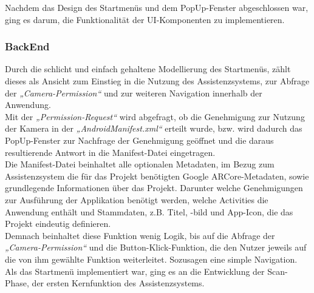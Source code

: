 Nachdem das Design des Startmenüs und dem PopUp-Fenster abgeschlossen war, ging es darum, die Funktionalität der UI-Komponenten zu implementieren. 
\subsubsection{BackEnd}
Durch die schlicht und einfach gehaltene Modellierung des Startmenüs, zählt dieses als Ansicht zum Einstieg in die Nutzung des Assistenzsystems, zur Abfrage der 
\textit{„Camera-Permission“} und zur weiteren Navigation innerhalb der Anwendung.
\\ 
Mit der \textit{„Permission-Request“} wird abgefragt, ob die Genehmigung zur Nutzung der Kamera in der \textit{„AndroidManifest.xml“} erteilt wurde, bzw. wird dadurch 
das PopUp-Fenster zur Nachfrage der Genehmigung geöffnet und die daraus resultierende Antwort in die Manifest-Datei eingetragen. 
\\ 
\linebreak
Die Manifest-Datei beinhaltet alle optionalen Metadaten, im Bezug zum Assistenzsystem die für das Projekt benötigten Google ARCore-Metadaten, sowie grundlegende 
Informationen über das Projekt. Darunter welche Genehmigungen zur Ausführung der Applikation benötigt werden, welche Activities die Anwendung enthält und 
Stammdaten, z.B. Titel, -bild und App-Icon, die das Projekt eindeutig definieren.
\\ 
\linebreak
Demnach beinhaltet diese Funktion wenig Logik, bis auf die Abfrage der \textit{„Camera-Permission“} und die Button-Klick-Funktion, die den Nutzer jeweils auf die 
von ihm gewählte Funktion weiterleitet. Sozusagen eine simple Navigation.
\\ 
\linebreak
Als das Startmenü implementiert war, ging es an die Entwicklung der Scan-Phase, der ersten Kernfunktion des Assistenzsystems.  

